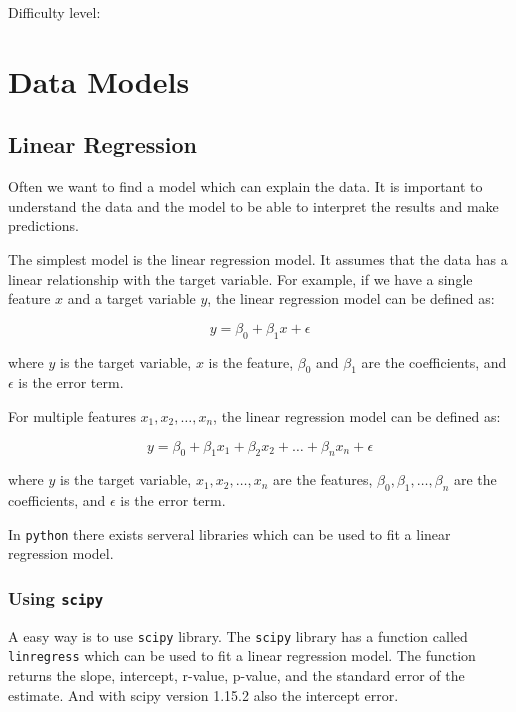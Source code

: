 \documentclass[
  letterpaper,
  DIV=11,
  numbers=noendperiod]{scrreprt}
\begin{document}
Difficulty level: { }

\chapter*{Data Models}\label{data-models}


\section*{Linear Regression~}\label{linear-regression}


Often we want to find a model which can explain the data. It is
important to understand the data and the model to be able to interpret
the results and make predictions.

The simplest model is the linear regression model. It assumes that the
data has a linear relationship with the target variable. For example, if
we have a single feature \(x\) and a target variable \(y\), the linear
regression model can be defined as:

\[
y = \beta_0 + \beta_1 x + \epsilon
\]

where \(y\) is the target variable, \(x\) is the feature, \(\beta_0\)
and \(\beta_1\) are the coefficients, and \(\epsilon\) is the error
term.

For multiple features \(x_1, x_2, \ldots, x_n\), the linear regression
model can be defined as:

\[
y = \beta_0 + \beta_1 x_1 + \beta_2 x_2 + \ldots + \beta_n x_n + \epsilon
\]

where \(y\) is the target variable, \(x_1, x_2, \ldots, x_n\) are the
features, \(\beta_0, \beta_1, \ldots, \beta_n\) are the coefficients,
and \(\epsilon\) is the error term.

In \texttt{python} there exists serveral libraries which can be used to
fit a linear regression model.

\subsection{\texorpdfstring{Using
\texttt{scipy}}{Using scipy}}\label{using-scipy}

A easy way is to use \texttt{scipy} library. The \texttt{scipy} library
has a function called \texttt{linregress} which can be used to fit a
linear regression model. The function returns the slope, intercept,
r-value, p-value, and the standard error of the estimate. And with scipy
version 1.15.2 also the intercept error.
\end{document}
